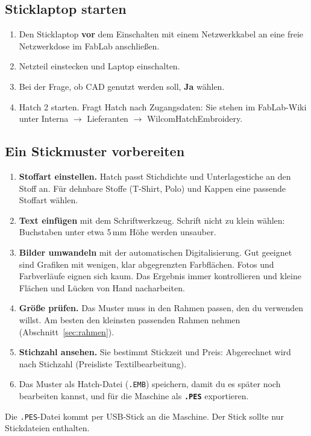 \documentclass{\basedir/fablab-document}
\newcommand{\pfeil}{\ensuremath{\rightarrow}}
\begin{document}
	\subsection{Sticklaptop starten}
	\begin{enumerate}
		\item Den Sticklaptop \textbf{vor} dem Einschalten mit einem Netzwerkkabel an eine freie Netzwerkdose im FabLab anschließen.
		\item Netzteil einstecken und Laptop einschalten.
		\item Bei der Frage, ob CAD genutzt werden soll, \textbf{Ja} wählen.
		\item Hatch 2 starten. Fragt Hatch nach Zugangsdaten: Sie stehen im FabLab-Wiki unter Interna \pfeil{} Lieferanten \pfeil{} WilcomHatchEmbroidery.
	\end{enumerate}

	\subsection{Ein Stickmuster vorbereiten}
	\begin{enumerate}
		\item \textbf{Stoffart einstellen.} Hatch passt Stichdichte und Unterlagestiche an den Stoff an. Für dehnbare Stoffe (T-Shirt, Polo) und Kappen eine passende Stoffart wählen.
		\item \textbf{Text einfügen} mit dem Schriftwerkzeug. Schrift nicht zu klein wählen: Buchstaben unter etwa 5\,mm Höhe werden unsauber.
		\item \textbf{Bilder umwandeln} mit der automatischen Digitalisierung. Gut geeignet sind Grafiken mit wenigen, klar abgegrenzten Farbflächen. Fotos und Farbverläufe eignen sich kaum. Das Ergebnis immer kontrollieren und kleine Flächen und Lücken von Hand nacharbeiten.
		\item \textbf{Größe prüfen.} Das Muster muss in den Rahmen passen, den du verwenden willst. Am besten den kleinsten passenden Rahmen nehmen (Abschnitt~\ref{sec:rahmen}).
		\item \textbf{Stichzahl ansehen.} Sie bestimmt Stickzeit und Preis: Abgerechnet wird nach Stichzahl (Preisliste Textilbearbeitung).
		\item Das Muster als Hatch-Datei (\texttt{.EMB}) speichern, damit du es später noch bearbeiten kannst, und für die Maschine als \textbf{\texttt{.PES}} exportieren.
	\end{enumerate}

	Die \texttt{.PES}-Datei kommt per USB-Stick an die Maschine. Der Stick sollte nur Stickdateien enthalten.
\end{document}
